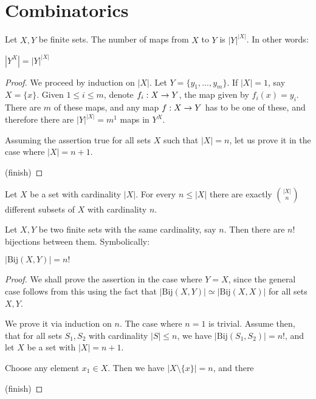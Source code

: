 \chapter{Combinatorics}


\begin{proposition}
	
	Let $X, Y$ be finite sets. The number of maps from $X$ to $Y$ is $|Y|^{|X|}$. In other words:
	
	\begin{center}
		$|Y^X| = |Y|^{|X|}$
	\end{center}
	
\end{proposition}

\begin{proof}
	We proceed by induction on $|X|$. Let $Y=\{y_1, ..., y_m \}$. If $|X| = 1$, say $X = \{x\}$. Given $1 \leq i \leq m$, denote $f_i:X \rightarrow Y$, the map given by $f_i(x)=y_i$. There are $m$ of these maps, and any map $f:X \rightarrow Y$ has to be one of these, and therefore there are $|Y|^{|X|} = m^1$ maps in $Y^X$.
	
	Assuming the assertion true for all sets $X$ such that $|X|=n$, let us prove it in the case where $|X|= n+1$.	
	
	(finish)
\end{proof}

\begin{proposition}
	Let $X$ be a set with cardinality $|X|$. For every $n\leq|X|$ there are exactly $\binom{|X|}{n}$ different subsets of $X$ with cardinality $n$.
\end{proposition}

\begin{proposition}
	Let $X, Y$ be two finite sets with the same cardinality, say $n$. Then there are $n!$ bijections between them. Symbolically:
	
	\begin{center}
		$|\text{Bij}(X, Y)| = n!$
	\end{center}
\end{proposition}

\begin{proof}
	We shall prove the assertion in the case where $Y=X$, since the general case follows from this using the fact that $|\text{Bij}(X, Y)| \simeq |\text{Bij}(X, X)|$ for all sets $X, Y$.
	
	We prove it via induction on $n$. The case where $n=1$ is trivial. Assume then, that for all sets $S_1, S_2$ with cardinality $|S| \leq n$, we have $|\text{Bij}(S_1, S_2)| = n!$, and let $X$ be a set with $|X|=n+1$.
	
	Choose any element $x_1 \in X$. Then we have $|X \setminus \{x \}|=n$, and there
	
	(finish)
\end{proof}





